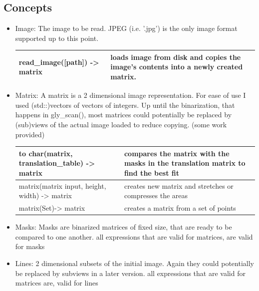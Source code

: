 \documentclass[12pt]{scrartcl}
\begin{document}
  \subsection{Concepts}
\begin{itemize}
\item Image: The image to be read. JPEG (i.e. '.jpg') is the only image format supported up to this point.\newline
\begin{tabular}{ m{6cm} m{7cm} }
\hline
read\_image([path]) -> matrix & loads image from disk and copies the image's contents into a newly created matrix.\\
\hline
\end{tabular}
\vspace{1cm}


\item Matrix: A matrix is a 2 dimensional image representation. For ease of use I used (std::)vectors of vectors of integers. Up until the binarization, that happens in gly\_scan(), most matrices could potentially be replaced by (sub)views of the actual image loaded to reduce copying. (some work provided)\newline
\begin{tabular}{ m{6cm} m{7cm} }
\hline
to char(matrix, translation\_table) -> matrix & compares the matrix with the masks in the translation matrix to find the best fit\\
\hline
matrix(matrix input, height, width) -> matrix & creates new matrix and stretches or compresses the areas\\ 
\hline
matrix(Set)-> matrix & creates a matrix from a set of points\\
\hline
\end{tabular} 
\vspace{1cm}

\item Masks: Masks are binarized matrices of fixed size, that are ready to be compared to one another.\newline
all expressions that are valid for matrices, are valid for masks
\vspace{1cm}


\item Lines: 2 dimensional subsets of the initial image. Again they could potentially be replaced by subviews in a later version.\newline
all expressions that are valid for matrices are, valid for lines
\vspace{1cm}



\end{itemize}
\end{document}
